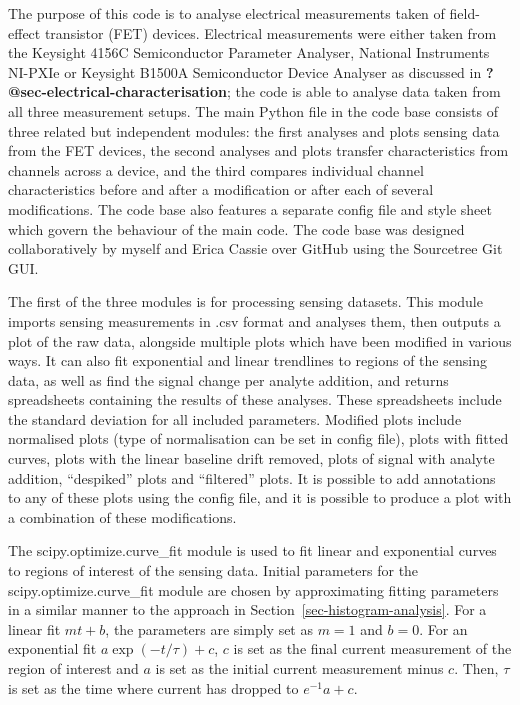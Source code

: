 \documentclass[
  a4paper,
]{scrbook}
\begin{document}
The purpose of this code is to analyse electrical measurements taken of
field-effect transistor (FET) devices. Electrical measurements were
either taken from the Keysight 4156C Semiconductor Parameter Analyser,
National Instruments NI-PXIe or Keysight B1500A Semiconductor Device
Analyser as discussed in \textbf{?@sec-electrical-characterisation}; the
code is able to analyse data taken from all three measurement setups.
The main Python file in the code base consists of three related but
independent modules: the first analyses and plots sensing data from the
FET devices, the second analyses and plots transfer characteristics from
channels across a device, and the third compares individual channel
characteristics before and after a modification or after each of several
modifications. The code base also features a separate config file and
style sheet which govern the behaviour of the main code. The code base
was designed collaboratively by myself and Erica Cassie over GitHub
using the Sourcetree Git GUI.

The first of the three modules is for processing sensing datasets. This
module imports sensing measurements in .csv format and analyses them,
then outputs a plot of the raw data, alongside multiple plots which have
been modified in various ways. It can also fit exponential and linear
trendlines to regions of the sensing data, as well as find the signal
change per analyte addition, and returns spreadsheets containing the
results of these analyses. These spreadsheets include the standard
deviation for all included parameters. Modified plots include normalised
plots (type of normalisation can be set in config file), plots with
fitted curves, plots with the linear baseline drift removed, plots of
signal with analyte addition, ``despiked'' plots and ``filtered'' plots.
It is possible to add annotations to any of these plots using the config
file, and it is possible to produce a plot with a combination of these
modifications.

The scipy.optimize.curve\_fit module is used to fit linear and
exponential curves to regions of interest of the sensing data. Initial
parameters for the scipy.optimize.curve\_fit module are chosen by
approximating fitting parameters in a similar manner to the approach in
Section~\ref{sec-histogram-analysis}. For a linear fit \(mt + b\), the
parameters are simply set as \(m=1\) and \(b=0\). For an exponential fit
\(a\exp{(-t/\tau)} + c\), \(c\) is set as the final current measurement
of the region of interest and \(a\) is set as the initial current
measurement minus \(c\). Then, \(\tau\) is set as the time where current
has dropped to \(e^{-1}a + c\).
\end{document}
